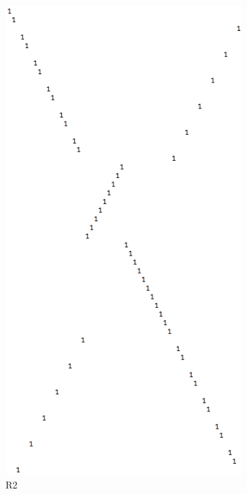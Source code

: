 \documentclass[11pt, oneside]{article}
\theoremstyle{plain}
\begin{document}
\begin{figure}[h!]
\begin{subfigure}[h]{0.4 \textwidth}
        \includegraphics[scale=0.30]{R2}
        \caption{R2}
    \end{subfigure}
    \begin{subfigure}[h]{0.4 \textwidth}

\end{subfigure}
\end{figure}
\end{document}
